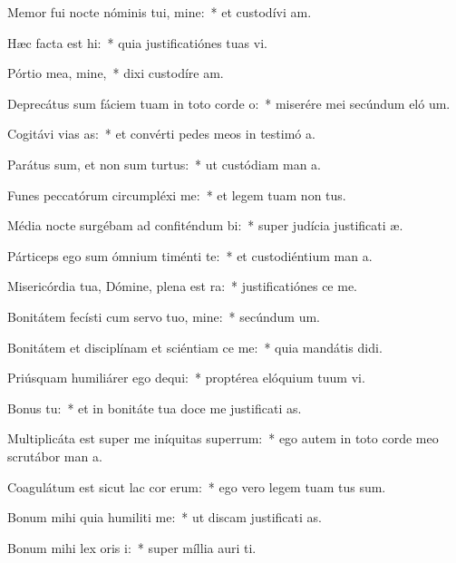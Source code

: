 \item Memor fui nocte nóminis tui, mine:~* et custodívi  am.
\item Hæc facta est hi:~* quia justificatiónes tuas vi.
\item Pórtio mea, mine,~* dixi custodíre  am.
\item Deprecátus sum fáciem tuam in toto corde o:~* miserére mei secúndum eló um.
\item Cogitávi vias as:~* et convérti pedes meos in testimó a.
\item Parátus sum, et non sum turtus:~* ut custódiam man a.
\item Funes peccatórum circumpléxi  me:~* et legem tuam non  tus.
\item Média nocte surgébam ad confiténdum bi:~* super judícia justificati æ.
\item Párticeps ego sum ómnium timénti te:~* et custodiéntium man a.
\item Misericórdia tua, Dómine, plena est ra:~* justificatiónes  ce me.
\item Bonitátem fecísti cum servo tuo, mine:~* secúndum  um.
\item Bonitátem et disciplínam et sciéntiam ce me:~* quia mandátis  didi.
\item Priúsquam humiliárer ego dequi:~* proptérea elóquium tuum vi.
\item Bonus  tu:~* et in bonitáte tua doce me justificati as.
\item Multiplicáta est super me iníquitas superrum:~* ego autem in toto corde meo scrutábor man a.
\item Coagulátum est sicut lac cor erum:~* ego vero legem tuam tus sum.
\item Bonum mihi quia humiliti me:~* ut discam justificati as.
\item Bonum mihi lex oris i:~* super míllia auri  ti.
